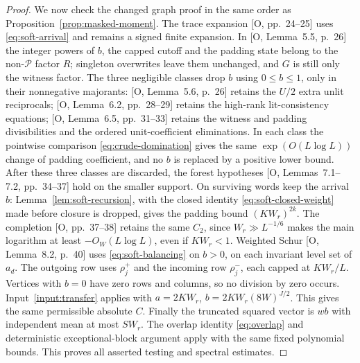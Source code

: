 \documentclass[11pt]{article}
\theoremstyle{definition}
\newcommand{\Pset}{\mathcal P}
\theoremstyle{remark}
\numberwithin{equation}{section}
\begin{document}
\begin{proof}
We now check the changed graph proof in the same order as Proposition~\ref{prop:masked-moment}.
The trace expansion [O, pp.~24--25] uses \eqref{eq:soft-arrival} and remains a signed finite expansion.
In [O, Lemma~5.5, p.~26] the integer powers of $b$, the capped cutoff and the padding state belong to the
non-$\Pset$ factor $R$; singleton overwrites leave them unchanged, and $G$ is still only the witness factor.
The three negligible classes drop $b$ using $0\le b\le1$, only in their nonnegative majorants:
[O, Lemma~5.6, p.~26] retains the $U/2$ extra unlit reciprocals;
[O, Lemma~6.2, pp.~28--29] retains the high-rank lit-consistency equations;
[O, Lemma~6.5, pp.~31--33] retains the witness and padding divisibilities and the ordered unit-coefficient
eliminations. In each class the pointwise comparison \eqref{eq:crude-domination} gives the same
$\exp(O(L\log L))$ change of padding coefficient, and no $b$ is replaced by a positive lower bound.
After these three classes are discarded, the forest hypotheses [O, Lemmas~7.1--7.2, pp.~34--37] hold on the
smaller support. On surviving words keep the arrival $b$: Lemma~\ref{lem:soft-recursion}, with the closed identity
\eqref{eq:soft-closed-weight} made before closure is dropped, gives the padding bound $(KW_r)^{2k}$.
The completion [O, pp.~37--38] retains the same $C_2$, since $W_r\gg L^{-1/6}$ makes the main logarithm at least
$-O_W(L\log L)$, even if $KW_r<1$.
Weighted Schur [O, Lemma~8.2, p.~40] uses \eqref{eq:soft-balancing} on $b>0$, on each invariant level set of
$a_d$. The outgoing row uses $\rho_j^+$ and the incoming row $\rho_j^-$, each capped at $KW_r/L$.
Vertices with $b=0$ have zero rows and columns, so no division by zero occurs. Input~\ref{input:transfer} applies
with $a=2KW_r$, $b=2KW_r(8W)^{J/2}$. This gives the same permissible absolute $C$.
Finally the truncated squared vector is $wb$ with independent mean at most $SW_r$.
The overlap identity \eqref{eq:overlap} and deterministic exceptional-block argument apply with the same fixed
polynomial bounds. This proves all asserted testing and spectral estimates.
\end{proof}
\end{document}
